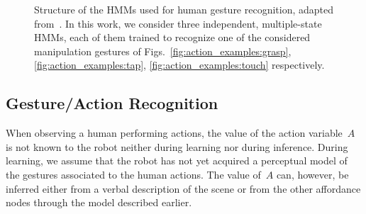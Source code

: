 \newcommand{\myscalefactor}{0.8}

\newcommand{\shapeOfHmmState}{circle} %

\newcommand{\standardhmm}[1]{
    \node[draw,\shapeOfHmmState] (hmm#1s1) {$s_1$};
    \node[draw,\shapeOfHmmState, right of=hmm#1s1] (hmm#1s2) {$s_2$};
    \node[\shapeOfHmmState, right of=hmm#1s2] (hmm#1s3) {\dots};
    \node[draw,\shapeOfHmmState, right of=hmm#1s3] (hmm#1s4) {$s_Q$};
    \node[left of=hmm#1s1]  (invisible1) {};
    \node[right of=hmm#1s4] (invisible2) {};
    \path[->] (hmm#1s1) edge (hmm#1s2);
    \path[loop above] (hmm#1s1) edge (hmm#1s1);
    \path[->] (hmm#1s2) edge (hmm#1s3);
    \path[loop above] (hmm#1s2) edge (hmm#1s2);
    \path[dashed] (hmm#1s2) -- (hmm#1s3);
    \path[->] (hmm#1s3) edge (hmm#1s4);
    \path[loop above] (hmm#1s4) edge (hmm#1s4);
    \path[->] (invisible1) edge (hmm#1s1);
    \path[->] (hmm#1s4) edge (invisible2);
}

\newcommand{\modeltwo}{
}

\begin{figure}
  \centering
  \modeltwo
  \caption{Structure of the \acp{HMM} used for human gesture recognition, adapted from~\cite{saponaro:2013:crhri}. In this work, we consider three independent, multiple-state \acp{HMM}, each of them trained to recognize one of the considered manipulation gestures of Figs.~\ref{fig:action_examples:grasp}, \ref{fig:action_examples:tap}, \ref{fig:action_examples:touch} respectively.}
  \label{fig:hmms}
\end{figure}

\subsection{Gesture/Action Recognition}
When observing a human performing actions, the value of the action variable~$A$ is not known to the robot neither during learning nor during inference.
During learning, we assume that the robot has not yet acquired a perceptual model of the gestures associated to the human actions.
The value of~$A$ can, however, be inferred either from a verbal description of the scene or from the other affordance nodes through the \AffWords{} model described earlier.

